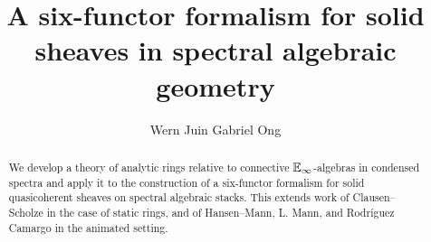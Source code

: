 \documentclass{amsart}
\theoremstyle{definition}
\numberwithin{equation}{section}
\begin{document}
\large
\title[A six-functor formalism for solid sheaves in spectral algebraic geometry]{A six-functor formalism for solid sheaves in spectral algebraic geometry}
\author{Wern Juin Gabriel Ong}
\address{Universit\"{a}t Bonn, Bonn, D-53113}
\begin{abstract}
  We develop a theory of analytic rings relative to connective $\mathbb{E}_{\infty}$-algebras in condensed spectra and apply it to the construction of a six-functor formalism for solid quasicoherent sheaves on spectral algebraic stacks. This extends work of Clausen--Scholze in the case of static rings, and of Hansen--Mann, L. Mann, and Rodr\'{i}guez Camargo in the animated setting.
\end{abstract}
\maketitle
\tableofcontents









\printbibliography
\end{document}
